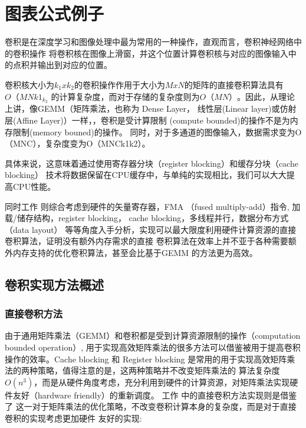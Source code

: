 
\chapter{图表公式例子}

卷积是在深度学习和图像处理中最为常用的一种操作，直观而言，卷积神经网络中的卷积操作
将卷积核在图像上滑窗，并这个位置计算卷积核与对应的图像输入中的点积并输出到对应的位置。

卷积核大小为$k_1xk_2$的卷积操作作用于大小为$MxN$的矩阵的直接卷积算法具有$O（MNk1_k_2$
的计算复杂度，而对于存储的复杂度则为$O（MN）$。因此，从理论上讲，像GEMM（矩阵乘法，也称为
Dense Layer， 线性层(Linear layer)或仿射层(Affine Layer)）一样，，卷积是受计算限制
(compute bounded)的操作不是为内存限制(memory bouned)的操作。
同时，对于多通道的图像输入，数据需求变为O（MNC），复杂度变为O（MNCk1k2）。

具体来说，这意味着通过使用寄存器分块（register blocking）和缓存分块（cache blocking）
技术将数据保留在CPU缓存中，与单纯的实现相比，我们可以大大提高CPU性能。

同时工作\cite{Zhang2018HighPZ} 则综合考虑到硬件的矢量寄存器，FMA （fused multiply-add）指令,
加载/储存结构，register blocking， cache blocking，多线程并行，数据分布方式（data layout）
等等角度入手分析，实现可以最大限度利用硬件计算资源的直接卷积算法，证明没有额外内存需求的直接
卷积算法在效率上并不亚于各种需要额外内存支持的优化卷积算法，甚至会比基于GEMM 的方法更为高效。

\section{卷积实现方法概述}

\subsection{直接卷积方法}

由于通用矩阵乘法（GEMM）和卷积都是受到计算资源限制的操作（computation bounded operation）,
用于实现高效矩阵乘法的很多方法可以借鉴被用于提高卷积操作的效率。Cache blocking 和 Register
blocking 是常用的用于实现高效矩阵乘法的两种策略，值得注意的是，这两种策略并不改变矩阵乘法的
算法复杂度$O(n^3)$，而是从硬件角度考虑，充分利用到硬件的计算资源，对矩阵乘法实现硬件友好（hardware
friendly）的重新调度。 工作\cite{Georganas2018AnatomyOH} 中的直接卷积方法实现则是借鉴了
这一对于矩阵乘法的优化策略，不改变卷积计算本身的复杂度，而是对于直接卷积的实现考虑更加硬件
友好的实现:

